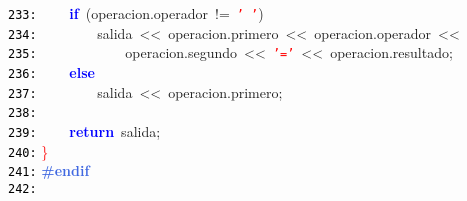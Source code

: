 \documentclass[a4paper,10pt]{scrartcl}
\begin{document}
{   \mbox{}\texttt{\textcolor{Black}{233:}} \ \ \ \ \textbf{\textcolor{Blue}{if}}\ \textcolor{BrickRed}{(}operacion\textcolor{BrickRed}{.}operador\ \textcolor{BrickRed}{!=}\ \texttt{\textcolor{Red}{'\ '}}\textcolor{BrickRed}{)} \\
   \mbox{}\texttt{\textcolor{Black}{234:}} \ \ \ \ \ \ \ \ salida\ \textcolor{BrickRed}{\textless{}\textless{}}\ operacion\textcolor{BrickRed}{.}primero\ \textcolor{BrickRed}{\textless{}\textless{}}\ operacion\textcolor{BrickRed}{.}operador\ \textcolor{BrickRed}{\textless{}\textless{}} \\
   \mbox{}\texttt{\textcolor{Black}{235:}} \ \ \ \ \ \ \ \ \ \ \ \ operacion\textcolor{BrickRed}{.}segundo\ \textcolor{BrickRed}{\textless{}\textless{}}\ \texttt{\textcolor{Red}{'='}}\ \textcolor{BrickRed}{\textless{}\textless{}}\ operacion\textcolor{BrickRed}{.}resultado\textcolor{BrickRed}{;} \\
   \mbox{}\texttt{\textcolor{Black}{236:}} \ \ \ \ \textbf{\textcolor{Blue}{else}}\  \\
   \mbox{}\texttt{\textcolor{Black}{237:}} \ \ \ \ \ \ \ \ salida\ \textcolor{BrickRed}{\textless{}\textless{}}\ operacion\textcolor{BrickRed}{.}primero\textcolor{BrickRed}{;} \\
   \mbox{}\texttt{\textcolor{Black}{238:}} \ \ \ \  \\
   \mbox{}\texttt{\textcolor{Black}{239:}} \ \ \ \ \textbf{\textcolor{Blue}{return}}\ salida\textcolor{BrickRed}{;} \\
   \mbox{}\texttt{\textcolor{Black}{240:}} \textcolor{Red}{\}} \\
   \mbox{}\texttt{\textcolor{Black}{241:}} \textbf{\textcolor{RoyalBlue}{\#endif}} \\
   \mbox{}\texttt{\textcolor{Black}{242:}} 
   }
   
   
   
   
   
   
\end{document}
